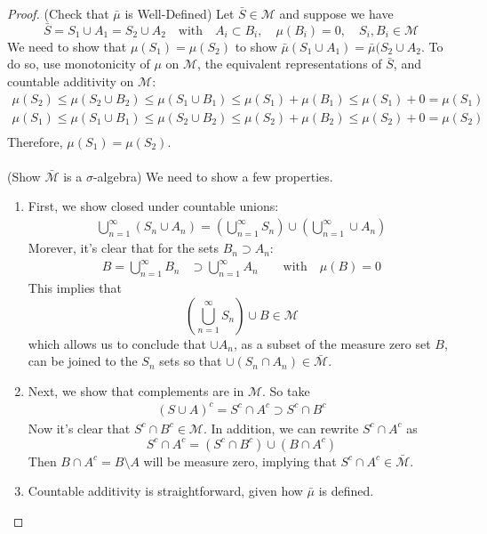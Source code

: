 \documentclass[12pt]{article}
\theoremstyle{plain}
\theoremstyle{definition}
\theoremstyle{remark}
\begin{document}
\begin{proof}
(Check that $\bar{\mu}$ is Well-Defined) Let $\bar{S}\in\mathscr{M}$ and suppose we have
\[
    \bar{S} = S_1 \cup A_1 = S_2 \cup A_2 
    \quad\text{with}\quad
    A_i \subset B_i, \quad \mu(B_i) = 0, 
    \quad S_i, B_i \in \mathscr{M}
\]
We need to show that $\mu(S_1) = \mu(S_2)$ to show $\bar{\mu}(S_1\cup A_1) = \bar{\mu}(S_2\cup A_2$. To do so, use monotonicity of $\mu$ on $\mathscr{M}$, the equivalent representations of $\bar{S}$, and countable additivity on $\mathscr{M}$:
\begin{align*}
    \mu(S_2) \leq \mu(S_2 \cup B_2) \leq 
        \mu(S_1 \cup B_1) \leq \mu(S_1) + \mu(B_1)
        \leq \mu(S_1) + 0 = \mu(S_1)  \\
    \mu(S_1) \leq \mu(S_1 \cup B_1) \leq 
        \mu(S_2 \cup B_2) \leq \mu(S_2) + \mu(B_2)
        \leq \mu(S_2) + 0 = \mu(S_2)  \\
\end{align*}
Therefore, $\mu(S_1) = \mu(S_2)$.
\\
\\
(Show $\bar{\mathscr{M}}$ is a $\sigma$-algebra) We need to show a few properties.
\begin{enumerate}
\item
First, we show closed under countable unions:
\begin{align*}
    \bigcup^\infty_{n=1} (S_n\cup A_n) = 
    \left(\bigcup^\infty_{n=1} S_n\right)
    \cup \left(\bigcup^\infty_{n=1}\cup A_n\right)
\end{align*}
Morever, it's clear that for the sets $B_n \supset A_n$:
\begin{align*}
    B = \bigcup^\infty_{n=1} B_n &\supset 
    \bigcup^\infty_{n=1} A_n 
    \qquad \text{with} \quad \mu(B) = 0
\end{align*}
This implies that
\[
    \left(\bigcup^\infty_{n=1} S_n\right) \cup B \in 
    {\mathscr{M}} 
\]
which allows us to conclude that $\cup A_n$, as a subset of the measure zero set $B$, can be joined to the $S_n$ sets so that $\cup (S_n \cap A_n)\in\bar{\mathscr{M}}$.

\item
Next, we show that complements are in $\mathscr{M}$. So take
\begin{align*}
    (S\cup A)^c = S^c \cap A^c \supset S^c \cap B^c
\end{align*}
Now it's clear that $S^c \cap B^c\in \mathscr{M}$. In addition, we can rewrite $S^c\cap A^c$ as
\[
    S^c\cap A^c = (S^c \cap B^c) \cup (B\cap A^c)
\]
Then $B \cap A^c = B\setminus A$ will be measure zero, implying that $S^c \cap A^c\in \bar{\mathscr{M}}$.

\item Countable additivity is straightforward, given how $\bar{\mu}$ is defined.
\end{enumerate}
\end{proof}
\end{document}
